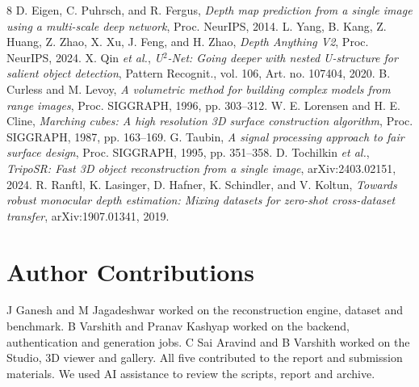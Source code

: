 \documentclass[conference]{IEEEtran}
\begin{document}
\begin{thebibliography}{8}
 D. Eigen, C. Puhrsch, and R. Fergus, \emph{Depth map prediction from a single image using a multi-scale deep network}, Proc. NeurIPS, 2014.
 L. Yang, B. Kang, Z. Huang, Z. Zhao, X. Xu, J. Feng, and H. Zhao, \emph{Depth Anything V2}, Proc. NeurIPS, 2024.
 X. Qin \emph{et al.}, \emph{U$^2$-Net: Going deeper with nested U-structure for salient object detection}, Pattern Recognit., vol. 106, Art. no. 107404, 2020.
 B. Curless and M. Levoy, \emph{A volumetric method for building complex models from range images}, Proc. SIGGRAPH, 1996, pp. 303--312.
 W. E. Lorensen and H. E. Cline, \emph{Marching cubes: A high resolution 3D surface construction algorithm}, Proc. SIGGRAPH, 1987, pp. 163--169.
 G. Taubin, \emph{A signal processing approach to fair surface design}, Proc. SIGGRAPH, 1995, pp. 351--358.
 D. Tochilkin \emph{et al.}, \emph{TripoSR: Fast 3D object reconstruction from a single image}, arXiv:2403.02151, 2024.
 R. Ranftl, K. Lasinger, D. Hafner, K. Schindler, and V. Koltun, \emph{Towards robust monocular depth estimation: Mixing datasets for zero-shot cross-dataset transfer}, arXiv:1907.01341, 2019.
\end{thebibliography}
\section*{Author Contributions}
J Ganesh and M Jagadeshwar worked on the reconstruction engine, dataset and benchmark. B Varshith and Pranav Kashyap worked on the backend, authentication and generation jobs. C Sai Aravind and B Varshith worked on the Studio, 3D viewer and gallery. All five contributed to the report and submission materials. We used AI assistance to review the scripts, report and archive.
\end{document}
